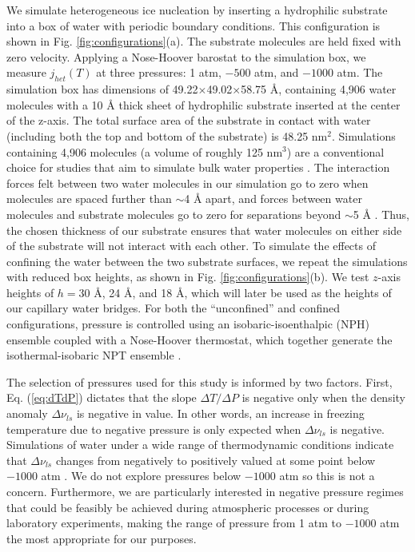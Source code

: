 \documentclass[journal abbreviation, manuscript]{copernicus}
\begin{document}
We simulate heterogeneous ice nucleation by inserting a hydrophilic substrate into a box of water with periodic boundary conditions. This configuration is shown in Fig. \ref{fig:configurations}(a). The substrate molecules are held fixed with zero velocity. Applying a Nose-Hoover barostat to the simulation box, we measure $j_{het}(T)$ at three pressures: 1 atm, $-500$ atm, and $-1000$ atm. The simulation box has dimensions of 49.22$\times$49.02$\times$58.75 \AA{}, containing 4,906 water molecules with a 10 \AA{} thick sheet of hydrophilic substrate inserted at the center of the z-axis. The total surface area of the substrate in contact with water (including both the top and bottom of the substrate) is 48.25 nm$^2$. Simulations containing 4,906 molecules (a volume of roughly 125 nm$^3$) are a conventional choice for studies that aim to simulate bulk water properties \citep[e.g.,][]{molinero2009, lupi2014, li2011}. The interaction forces felt between two water molecules in our simulation go to zero when molecules are spaced further than $\sim$4 \AA{} apart, and forces between water molecules and substrate molecules go to zero for separations beyond $\sim$5 \AA{} \citep{molinero2009}. Thus, the chosen thickness of our substrate ensures that water molecules on either side of the substrate will not interact with each other. To simulate the effects of confining the water between the two substrate surfaces, we repeat the simulations with reduced box heights, as shown in Fig. \ref{fig:configurations}(b). We test $z$-axis heights of $h = 30$ \AA{}, 24 \AA{}, and 18 \AA{}, which will later be used as the heights of our capillary water bridges. For both the ``unconfined'' and confined configurations, pressure is controlled using an isobaric-isoenthalpic (NPH) ensemble coupled with a Nose-Hoover thermostat, which together generate the isothermal-isobaric NPT ensemble \citep{allentildesley}.

The selection of pressures used for this study is informed by two factors. First, Eq. (\ref{eq:dTdP}) dictates that the slope $\Delta T/ \Delta P$ is negative only when the density anomaly $\Delta \nu_{ls}$ is negative in value. In other words, an increase in freezing temperature due to negative pressure is only expected when $\Delta \nu_{ls}$ is negative. Simulations of water under a wide range of thermodynamic conditions indicate that $\Delta \nu_{ls}$ changes from negatively to positively valued at some point below $-1000$ atm \citep{bianco2021}. We do not explore pressures below $-1000$ atm so this is not a concern. Furthermore, we are particularly interested in negative pressure regimes that could be feasibly be achieved during atmospheric processes or during laboratory experiments, making the range of pressure from 1 atm to $-1000$ atm the most appropriate for our purposes.
\end{document}
